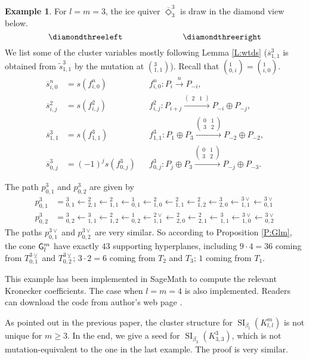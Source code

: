 \documentclass{amsart}
\theoremstyle{definition}
\newtheorem{example}[theorem]{Example}
\theoremstyle{remark}
\numberwithin{equation}{section}
\DeclareMathOperator{\SI}{SI}
\newcommand{\mr}[1]{{\sf #1}}%
\newcommand{\br}[1]{\overline{#1}}
\newcommand{\wtd}[1]{\widetilde{#1}}
\newcommand{\sm}[1]{{\left(\begin{smallmatrix}#1\end{smallmatrix}\right)}}
\newcommand{\kllm}{{K_{l,l}^m}}
\newcommand{\bl}{{\beta_l}}
\begin{document}
\begin{example} \label{ex:333} For $l=m=3$, the ice quiver $\br{\Diamond}_3^3$ is draw in the diamond view below.
$$\diamondthreeleft \hspace{1in} \diamondthreeright$$
We list some of the cluster variables mostly following Lemma \ref{L:wtds} ($\br{s}_{1,1}^3$ is obtained from $\wtd{s}_{1,1}^3$ by the mutation at $(_{1,1}^3)$).
Recall that $(_{0,i}^1)=(_{i,0}^1)$.
\begin{align*}
\br{s}_{i,0}^n&=s(f_{i,0}^n) && f_{i,0}^n: P_{i} \xrightarrow{n} P_{-i},\\
\br{s}_{i,j}^2&=s(f_{i,j}^2) && f_{i,j}^2: P_{i+j} \xrightarrow{\sm{2&1}} P_{-i}\oplus P_{-j}, \\
\br{s}_{1,1}^3&=s(f_{1,1}^3) && f_{1,1}^3: P_{1}\oplus P_3 \xrightarrow{\sm{0&1\\3&2}} P_{-2}\oplus P_{-2}, \\
\br{s}_{0,j}^3&=(-1)^js(f_{0,j}^3) && f_{0,j}^3: P_{j}\oplus P_3 \xrightarrow{\sm{0&1\\3&2}} P_{-j}\oplus P_{-3}.
\end{align*}

The path $p_{0,1}^3$ and $p_{0,2}^3$ are given by
\begin{align*}
 p_{0,1}^3&={_{0,1}^3}\leftarrow{_{2,1}^2}\leftarrow{_{1,1}^2}\leftarrow{_{0,1}^1}\leftarrow{_{1,0}^2}\leftarrow{_{1,1}^2}\leftarrow{_{1,2}^2}\leftarrow{_{2,0}^3}\leftarrow{_{1,1}^{3\vee}}\leftarrow{_{0,1}^{3\vee}}\\
 p_{0,2}^3&={_{0,2}^3}\leftarrow{_{1,1}^3}\leftarrow{_{1,2}^2}\leftarrow{_{0,2}^1}\leftarrow{_{1,1}^{2\vee}}\leftarrow{_{2,0}^2}\leftarrow{_{2,1}^2}\leftarrow{_{1,1}^3}\leftarrow{_{1,0}^{3\vee}}\leftarrow{_{0,2}^{3\vee}}
\end{align*}
The paths $p_{0,1}^{3\vee}$ and $p_{0,2}^{3\vee}$ are very similar.
So according to Proposition \ref{P:Glm}, the cone $\mr{G}_l^m$ have exactly $43$ supporting hyperplanes, including
$9\cdot4=36$ coming from $T_{0,1}^{3\veebar}$ and $T_{0,2}^{3\veebar}$;
$3\cdot2=6$ coming from $T_2$ and $T_3$; $1$ coming from $T_1$.

This example has been implemented in SageMath \cite{sage} to compute the relevant Kronecker coefficients.
The case when $l=m=4$ is also implemented. Readers can download the code from author's web page \cite{Fweb}.
\end{example}

As pointed out in the previous paper, the cluster structure for $\SI_\bl(\kllm)$ is not unique for $m\geq 3$.
In the end, we give a seed for $\SI_{\beta_3}(K_{3,3}^3)$, which is not mutation-equivalent to the one in the last example.
The proof is very similar.
\end{document}

